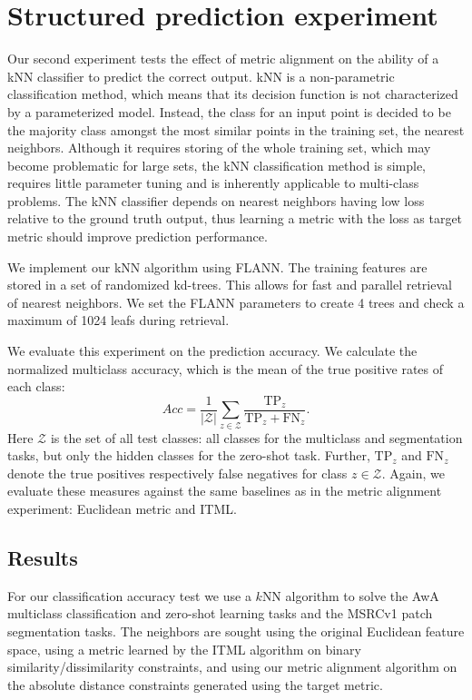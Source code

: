 \section{Structured prediction experiment}

Our second experiment tests the effect of metric alignment on the ability of a \acf{kNN} classifier to predict the correct output. \ac{kNN} is a non-parametric classification method, which means that its decision function is not characterized by a parameterized model. Instead, the class for an input point is decided to be the majority class amongst the most similar points in the training set, the nearest neighbors. Although it requires storing of the whole training set, which may become problematic for large sets, the \ac{kNN} classification method is simple, requires little parameter tuning and is inherently applicable to multi-class problems. The \ac{kNN} classifier depends on nearest neighbors having low loss relative to the ground truth output, thus learning a metric with the loss as target metric should improve prediction performance.

We implement our \ac{kNN} algorithm using \ac{FLANN}. \cite{muja2009fast} The training features are stored in a set of randomized kd-trees. This allows for fast and parallel retrieval of nearest neighbors. We set the \ac{FLANN} parameters to create 4 trees and check a maximum of 1024 leafs during retrieval.

We evaluate this experiment on the prediction accuracy. We calculate the normalized multiclass accuracy, which is the mean of the true positive rates of each class:
\begin{equation}
Acc = \frac{1}{|\mathcal{Z}|} \sum_{z \in \mathcal{Z}} \frac{\text{TP}_z}{\text{TP}_z + \text{FN}_z}.
\end{equation}
Here $\mathcal{Z}$ is the set of all test classes: all classes for the multiclass and segmentation tasks, but only the hidden classes for the zero-shot task. Further, $\text{TP}_z$ and $\text{FN}_z$ denote the true positives respectively false negatives for class $z \in \mathcal{Z}$. Again, we evaluate these measures against the same baselines as in the metric alignment experiment: Euclidean metric and \ac{ITML}.


\subsection{Results}

For our classification accuracy test we use a $k$NN algorithm to solve the AwA multiclass classification and zero-shot learning tasks and the MSRCv1 patch segmentation tasks. The neighbors are sought using the original Euclidean feature space, using a metric learned by the ITML algorithm on binary similarity/dissimilarity constraints, and using our metric alignment algorithm on the absolute distance constraints generated using the target metric.

